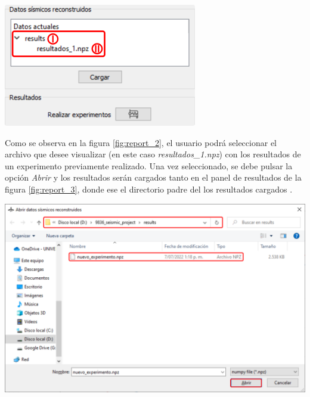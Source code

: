\documentclass[12pt,twoside,letter]{ol-softwaremanual}
\newcommand*\circled[1]{\tikz[baseline=(char.base)]{
            \node[shape=circle,draw,inner sep=2pt] (char) {#1};}}
\newenvironment{Figure}
  {\par\medskip\noindent\minipage{\linewidth}}
  {\endminipage\par\medskip}
\begin{document}
\begin{multicols}{2}

\begin{Figure}
	\centering
	\includegraphics[width=0.8\linewidth]{report-3.png}
	\label{fig:report_3}
\end{Figure}

Como se observa en la figura \ref{fig:report_2}, el usuario podrá seleccionar el archivo que desee visualizar (en este caso \emph{resultados\_1.npz}) con los resultados de un experimento previamente realizado. Una vez seleccionado, se debe pulsar la opción \emph{Abrir} y los resultados serán cargados tanto en el panel de resultados de la figura \ref{fig:report_3}, donde \circled{I} ese el directorio padre del los resultados cargados \circled{II}.

\end{multicols}

\begin{Figure}
    \centering
    \includegraphics[width=0.9\linewidth]{report-2.png}
    \label{fig:report_2}
\end{Figure}
\end{document}
